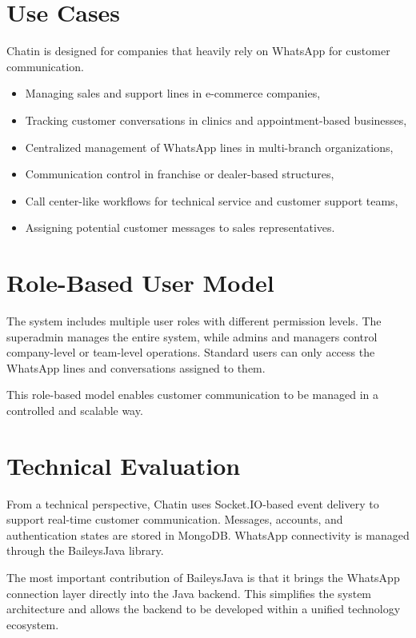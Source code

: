 \documentclass[12pt,a4paper]{article}
\begin{document}
\section{Use Cases}

Chatin is designed for companies that heavily rely on WhatsApp for customer communication.

\begin{itemize}
    \item Managing sales and support lines in e-commerce companies,
    \item Tracking customer conversations in clinics and appointment-based businesses,
    \item Centralized management of WhatsApp lines in multi-branch organizations,
    \item Communication control in franchise or dealer-based structures,
    \item Call center-like workflows for technical service and customer support teams,
    \item Assigning potential customer messages to sales representatives.
\end{itemize}

\section{Role-Based User Model}

The system includes multiple user roles with different permission levels. The superadmin manages the entire system, while admins and managers control company-level or team-level operations. Standard users can only access the WhatsApp lines and conversations assigned to them.

This role-based model enables customer communication to be managed in a controlled and scalable way.

\section{Technical Evaluation}

From a technical perspective, Chatin uses Socket.IO-based event delivery to support real-time customer communication. Messages, accounts, and authentication states are stored in MongoDB. WhatsApp connectivity is managed through the BaileysJava library.

The most important contribution of BaileysJava is that it brings the WhatsApp connection layer directly into the Java backend. This simplifies the system architecture and allows the backend to be developed within a unified technology ecosystem.
\end{document}
